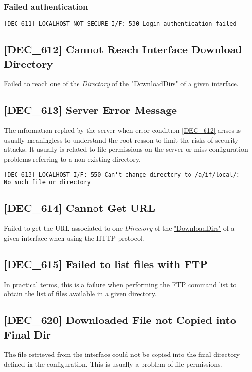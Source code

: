 \documentclass[dec_sum_main.tex]{subfiles}
\begin{document}
\subsubsection{Failed authentication}
\begin{verbatim}
[DEC_611] LOCALHOST_NOT_SECURE I/F: 530 Login authentication failed
\end{verbatim}

\subsection{[DEC\_612] Cannot Reach Interface Download Directory}
\label{DEC612}
Failed to reach one of the \textit{Directory} of the \hyperref[DownloadDirs]{"DownloadDirs"} of a given interface.

\subsection{[DEC\_613] Server Error Message }
The information replied by the server when error condition \hyperref[DEC612]{[DEC\_612]} arises is usually meaningless to understand the root reason to limit the risks of security attacks. It usually is related to file permissions on the server or miss-configuration problems referring to a non existing directory.
\begin{verbatim}
[DEC_613] LOCALHOST I/F: 550 Can't change directory to /a/if/local/: No such file or directory
\end{verbatim}

\label{DEC614}
\subsection{[DEC\_614] Cannot Get URL}
Failed to get the URL associated to one \textit{Directory} of the \hyperref[DownloadDirs]{"DownloadDirs"} of a given interface when using the HTTP protocol.

\label{DEC615}
\subsection{[DEC\_615] Failed to list files with FTP}
In practical terms, this is a failure when performing the FTP command list to obtain the list of files available in a given directory.

\subsection{[DEC\_620] Downloaded File not Copied into Final Dir}
\label{DEC620}
The file retrieved from the interface could not be copied into the final directory defined in the configuration. This is usually a problem of file permissions. 
\end{document}
